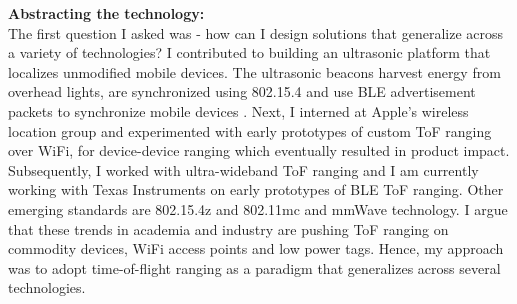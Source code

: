 \documentclass[10pt]{article}
\begin{document}
\textbf{Abstracting the technology: }\\
The first question I asked was - how can I design solutions that generalize across a variety of technologies? 
I contributed to building an ultrasonic platform that localizes unmodified mobile devices. The ultrasonic beacons harvest energy from overhead lights, are synchronized using 802.15.4 and use BLE advertisement packets to synchronize mobile devices \cite{rtas-alps-platform, lazik2015alps,lazik2015alpsdemo}. Next, I interned at Apple's wireless location group and experimented with early prototypes of custom ToF ranging over WiFi, for device-device ranging which eventually resulted in product impact. Subsequently, I worked with ultra-wideband ToF ranging and I am currently working with Texas Instruments on early prototypes of BLE ToF ranging. Other emerging standards are 802.15.4z and 802.11mc and mmWave technology. I argue that these trends in academia and industry are pushing ToF ranging on commodity devices, WiFi access points and low power tags. Hence, my approach was to adopt time-of-flight ranging as a paradigm that generalizes across several technologies. %

\end{document}
